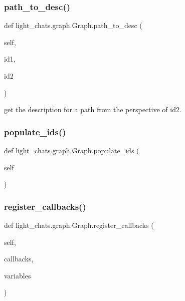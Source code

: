 \subsubsection{\texorpdfstring{path\+\_\+to\+\_\+desc()}{path\_to\_desc()}}
{\footnotesize\ttfamily def light\+\_\+chats.\+graph.\+Graph.\+path\+\_\+to\+\_\+desc (\begin{DoxyParamCaption}\item[{}]{self,  }\item[{}]{id1,  }\item[{}]{id2 }\end{DoxyParamCaption})}

\begin{DoxyVerb}get the description for a path from the perspective of id2.
\end{DoxyVerb}
 \mbox{\label{classlight__chats_1_1graph_1_1Graph_a604091edb800be1aad16f3a64f13d6da}} 
\subsubsection{\texorpdfstring{populate\+\_\+ids()}{populate\_ids()}}
{\footnotesize\ttfamily def light\+\_\+chats.\+graph.\+Graph.\+populate\+\_\+ids (\begin{DoxyParamCaption}\item[{}]{self }\end{DoxyParamCaption})}

\mbox{\label{classlight__chats_1_1graph_1_1Graph_aa40b8fea9737da5d3f329dfb00c42c6f}} 
\subsubsection{\texorpdfstring{register\+\_\+callbacks()}{register\_callbacks()}}
{\footnotesize\ttfamily def light\+\_\+chats.\+graph.\+Graph.\+register\+\_\+callbacks (\begin{DoxyParamCaption}\item[{}]{self,  }\item[{}]{callbacks,  }\item[{}]{variables }\end{DoxyParamCaption})}

